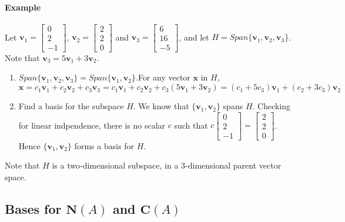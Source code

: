 \documentclass[../linear-algebra.tex]{subfiles}
\begin{document}
\paragraph{Example} Let $\mathbf{v}_{1}=\begin{bmatrix}0\\ 2\\ -1\end{bmatrix}$, $\mathbf{v}_{2}=\begin{bmatrix}2\\ 2\\ 0\end{bmatrix}$ and $\mathbf{v}_{3}=\begin{bmatrix}6\\ 16\\ -5\end{bmatrix}$, and let $H=Span\{\mathbf{v}_{1},\mathbf{v}_{2},\mathbf{v}_{3}\}$.
Note that $\mathbf{v}_{3}=5\mathbf{v}_{1}+3\mathbf{v}_{2}$.
\begin{enumerate}
    \item $Span\{\textbf{v}_{1},\textbf{v}_{2},\textbf{v}_{3}\}=Span\{\textbf{v}_{1},\textbf{v}_{2}\}$.\newline    For any vector $\mathbf{x}$ in $H$,
    $$\textbf{x} = c_{1}\textbf{v}_{1} + c_{2}\textbf{v}_{2} + c_{3}\textbf{v}_{3} = c_{1}\textbf{v}_{1} + c_{2}\textbf{v}_{2} + c_{3}(5\textbf{v}_{1} + 3\textbf{v}_{2}) = (c_{1} + 5c_{3})\textbf{v}_{1} + (c_{2} + 3c_{3})\textbf{v}_{2}$$    \item Find a basis for the subspace $H$.\newline
    We know that $\{\mathbf{v}_1,\mathbf{v}_2\}$ spans $H$. Checking for linear indpendence,
    there is no scalar $c$ such that $c\begin{bmatrix}0\\ 2\\ -1\end{bmatrix} = \begin{bmatrix}2\\ 2\\ 0\end{bmatrix}$.
    Hence $\{\mathbf{v}_1,\mathbf{v}_2\}$ forms a basis for  $H$.
\end{enumerate}
Note that $H$ is a two-dimensional subspace, in a 3-dimensional parent vector space.

\subsection{Bases for $\mathbf{N}(A)$ and $\mathbf{C}(A)$}
\end{document}
